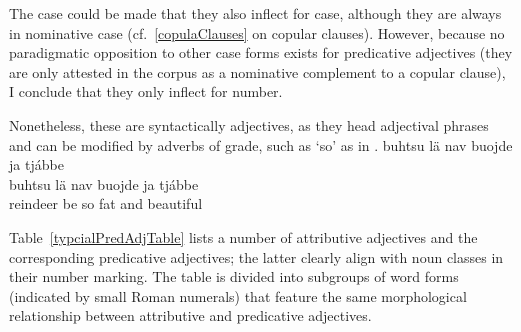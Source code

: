 The case could be made that they also inflect for case, although they are always in nominative case (cf.~\SEC\ref{copulaClauses} on copular clauses). %
However, because no paradigmatic opposition to other case forms exists for predicative adjectives (they are only attested in the corpus as a nominative complement to a copular clause), I conclude that they only inflect for number. 

Nonetheless, these are syntactically adjectives, as they head adjectival phrases and can be modified by adverbs of grade, such as  ‘so’ as in .
\ea\label{adjPredEx3}
\glll	buhtsu lä nav buojde ja tjábbe\\
	buhtsu lä nav buojde ja tjábbe\\
	reindeer\BS{} be\BS{} so fat\BS{} and beautiful\BS{}\\\nopagebreak
{}	
\z

Table~\vref{typcialPredAdjTable} lists a number of attributive adjectives and the corresponding predicative adjectives; the latter clearly align with noun classes in their number marking. %
The table is divided into subgroups of word forms (indicated by small Roman numerals) that feature the same morphological relationship between attributive and predicative adjectives. 

